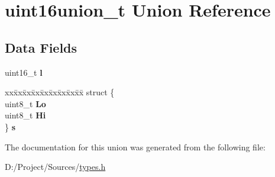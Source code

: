 \hypertarget{unionuint16union__t}{}\section{uint16union\+\_\+t Union Reference}
\label{unionuint16union__t}
\subsection*{Data Fields}
\begin{DoxyCompactItemize}
\item 
\hypertarget{unionuint16union__t_a99ee3a3f73300849c180c387230c7caa}{}uint16\+\_\+t {\bfseries l}\label{unionuint16union__t_a99ee3a3f73300849c180c387230c7caa}

\item 
\hypertarget{unionuint16union__t_a1cb156304a2b88c27621570c9a95d016}{}\begin{tabbing}
xx\=xx\=xx\=xx\=xx\=xx\=xx\=xx\=xx\=\kill
struct \{\\
\>uint8\_t {\bfseries Lo}\\
\>uint8\_t {\bfseries Hi}\\
\} {\bfseries s}\label{unionuint16union__t_a1cb156304a2b88c27621570c9a95d016}
\\

\end{tabbing}\end{DoxyCompactItemize}


The documentation for this union was generated from the following file\+:\begin{DoxyCompactItemize}
\item 
D\+:/\+Project/\+Sources/\hyperlink{types_8h}{types.\+h}\end{DoxyCompactItemize}
